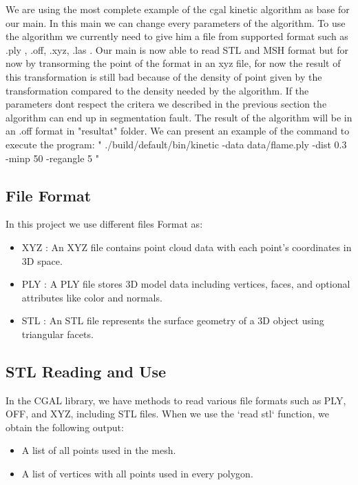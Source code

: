 \documentclass{article}
\begin{document}
We are using the most complete example of the cgal kinetic algorithm as base for our main. In this main we can change every parameters of the algorithm.
\newline
To use the algorithm we currently need to give him a file from supported format such as .ply , .off, .xyz, .las .
Our main is now able to read STL and MSH format but for now by transorming the point of the format in an xyz file,
for now the result of this transformation is still bad because of the density of point given by the transformation compared to the density needed by the algorithm.
If the parameters dont respect the critera we described in the previous section the algorithm can end up in segmentation fault.
The result of the algorithm will be in an .off format in "resultat" folder.
\newline
We can present an example of the command to execute the program:
\newline
" ./build/default/bin/kinetic -data data/flame.ply -dist 0.3 -minp 50 -regangle 5 "
\newline


\subsection{File Format}
In this project we use different files Format as: 

\begin{itemize}
  \item XYZ : An XYZ file contains point cloud data with each point's coordinates in 3D space.
  \item PLY : A PLY file stores 3D model data including vertices, faces, and optional attributes like color and normals.
  \item STL : An STL file represents the surface geometry of a 3D object using triangular facets.
  
\end{itemize}

\subsection{STL Reading and Use}

In the CGAL library, we have methods to read various file formats such as PLY, OFF, and XYZ, including STL files. When we use the `read stl` function, we obtain the following output:

\begin{itemize}
  \item A list of all points used in the mesh.
  \item A list of vertices with all points used in every polygon.
\end{itemize}
\end{document}
